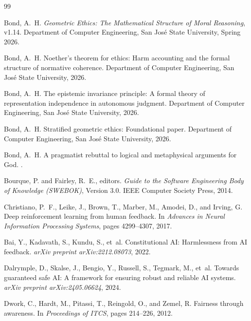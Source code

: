 \documentclass[12pt,letterpaper]{article}
\theoremstyle{definition}
\theoremstyle{plain}
\begin{document}
\begin{thebibliography}{99}

Bond, A.~H.
\newblock \emph{Geometric Ethics: The Mathematical Structure of Moral Reasoning}, v1.14.
\newblock Department of Computer Engineering, San Jos\'{e} State University, Spring 2026.

Bond, A.~H.
\newblock Noether's theorem for ethics: Harm accounting and the formal structure of normative coherence.
\newblock Department of Computer Engineering, San Jos\'{e} State University, 2026.

Bond, A.~H.
\newblock The epistemic invariance principle: A formal theory of representation independence in autonomous judgment.
\newblock Department of Computer Engineering, San Jos\'{e} State University, 2026.

Bond, A.~H.
\newblock Stratified geometric ethics: Foundational paper.
\newblock Department of Computer Engineering, San Jos\'{e} State University, 2026.

Bond, A.~H.
\newblock A pragmatist rebuttal to logical and metaphysical arguments for God.
.

Bourque, P. and Fairley, R.~E., editors.
\newblock \emph{Guide to the Software Engineering Body of Knowledge (SWEBOK)}, Version 3.0.
\newblock IEEE Computer Society Press, 2014.

Christiano, P.~F., Leike, J., Brown, T., Marber, M., Amodei, D., and Irving, G.
\newblock Deep reinforcement learning from human feedback.
\newblock In \emph{Advances in Neural Information Processing Systems}, pages 4299--4307, 2017.

Bai, Y., Kadavath, S., Kundu, S., et~al.
\newblock Constitutional AI: Harmlessness from AI feedback.
\newblock \emph{arXiv preprint arXiv:2212.08073}, 2022.

Dalrymple, D., Skalse, J., Bengio, Y., Russell, S., Tegmark, M., et~al.
\newblock Towards guaranteed safe AI: A framework for ensuring robust and reliable AI systems.
\newblock \emph{arXiv preprint arXiv:2405.06624}, 2024.

Dwork, C., Hardt, M., Pitassi, T., Reingold, O., and Zemel, R.
\newblock Fairness through awareness.
\newblock In \emph{Proceedings of ITCS}, pages 214--226, 2012.


\end{thebibliography}
\end{document}

